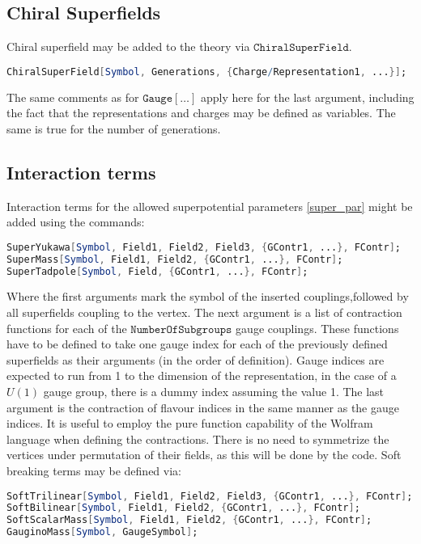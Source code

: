 \documentclass{scrartcl}
\begin{document}
\subsection{Chiral Superfields}
Chiral superfield may be added to the theory via $\mathtt{ChiralSuperField}$.
\begin{lstlisting}[language=mathematica,mathescape,columns=flexible,backgroundcolor=\color{light-gray}]
ChiralSuperField[Symbol, Generations, {Charge/Representation1, ...}];
\end{lstlisting}
The same comments as for $\mathtt{Gauge[\dots]}$ apply here for the last argument, including the fact that the representations and charges may be defined as variables. The same is true for the number of generations.
\FloatBarrier
\subsection{Interaction terms}
Interaction terms for the allowed superpotential parameters \ref{super_par} might be added using the commands:
\begin{lstlisting}[language=mathematica,mathescape,columns=flexible,backgroundcolor=\color{light-gray}]
SuperYukawa[Symbol, Field1, Field2, Field3, {GContr1, ...}, FContr];
SuperMass[Symbol, Field1, Field2, {GContr1, ...}, FContr];
SuperTadpole[Symbol, Field, {GContr1, ...}, FContr];
\end{lstlisting}
Where the first arguments mark the symbol of the inserted couplings,followed by all superfields coupling to the vertex. The next argument is a list of contraction functions for each of the $\mathtt{NumberOfSubgroups}$ gauge couplings. These functions have to be defined to take one gauge index for each of the previously defined superfields as their arguments (in the order of definition). Gauge indices are expected to run from 1 to the dimension of the representation, in the case of a $U(1)$ gauge group, there is a dummy index assuming the value 1. The last argument is the contraction of flavour indices in the same manner as the gauge indices. It is useful to employ the pure function capability of the Wolfram language when defining the contractions. There is no need to symmetrize the vertices under permutation of their fields, as this will be done by the code.
\newline
Soft breaking terms may be defined via:
\begin{lstlisting}[language=mathematica,mathescape,columns=flexible,backgroundcolor=\color{light-gray}]
SoftTrilinear[Symbol, Field1, Field2, Field3, {GContr1, ...}, FContr];
SoftBilinear[Symbol, Field1, Field2, {GContr1, ...}, FContr];
SoftScalarMass[Symbol, Field1, Field2, {GContr1, ...}, FContr];
GauginoMass[Symbol, GaugeSymbol];
\end{lstlisting}
\end{document}
